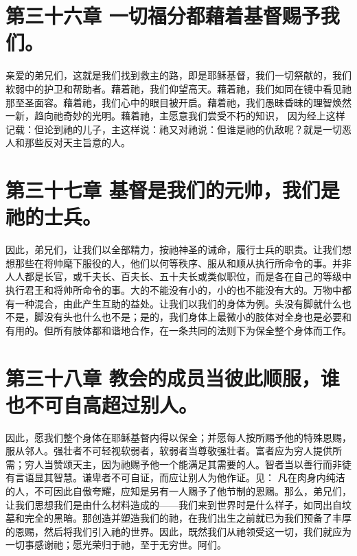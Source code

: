 
\section{第三十六章 一切福分都藉着基督赐予我们。}

亲爱的弟兄们，这就是我们找到救主的路，即是耶稣基督，我们一切祭献的，我们软弱中的护卫和帮助者。藉着祂，我们仰望高天。藉着祂，我们如同在镜中看见祂那至圣面容。藉着祂，我们心中的眼目被开启。藉着祂，我们愚昧昏昧的理智焕然一新，趋向祂奇妙的光明。藉着祂，主愿意我们尝受不朽的知识， 因为经上这样记载：但论到祂的儿子，主这样说：祂又对祂说：但谁是祂的仇敌呢？就是一切恶人和那些反对天主旨意的人。\par


\section{第三十七章 基督是我们的元帅，我们是祂的士兵。}

因此，弟兄们，让我们以全部精力，按祂神圣的诫命，履行士兵的职责。让我们想想那些在将帅麾下服役的人，他们以何等秩序、服从和顺从执行所命令的事。并非人人都是长官，或千夫长、百夫长、五十夫长或类似职位，而是各在自己的等级中执行君王和将帅所命令的事。大的不能没有小的，小的也不能没有大的。万物中都有一种混合，由此产生互助的益处。让我们以我们的身体为例。头没有脚就什么也不是，脚没有头也什么也不是；是的，我们身体上最微小的肢体对全身也是必要和有用的。但所有肢体都和谐地合作，在一条共同的法则下为保全整个身体而工作。\par


\section{第三十八章 教会的成员当彼此顺服，谁也不可自高超过别人。}

因此，愿我们整个身体在耶稣基督内得以保全；并愿每人按所赐予他的特殊恩赐，服从邻人。强壮者不可轻视软弱者，软弱者当尊敬强壮者。富者应为穷人提供所需；穷人当赞颂天主，因为祂赐予他一个能满足其需要的人。智者当以善行而非徒有言语显其智慧。谦卑者不可自证，而应让别人为他作证。见： 凡在肉身内纯洁的人，不可因此自傲夸耀，应知是另有一人赐予了他节制的恩赐。那么，弟兄们，让我们思想我们是由什么材料造成的——我们来到世界时是什么样子，如同出自坟墓和完全的黑暗。那创造并塑造我们的祂，在我们出生之前就已为我们预备了丰厚的恩赐，然后将我们引入祂的世界。因此，既然我们从祂领受这一切，我们就应为一切事感谢祂；愿光荣归于祂，至于无穷世。阿们。\par


